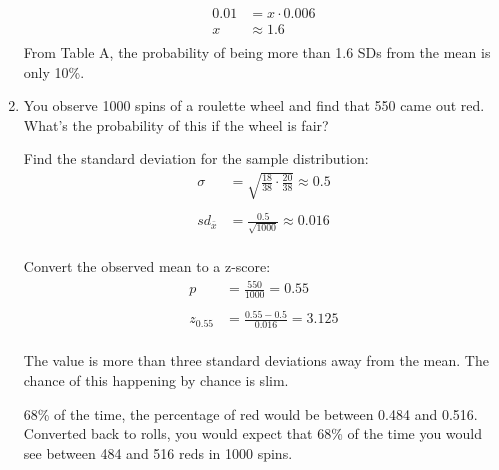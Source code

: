 \documentclass[portrait]{exam}
\begin{document}
\begin{enumerate}
\begin{solution}
        \begin{align*}
          0.01 & = x \cdot 0.006 \\
          x   & \approx 1.6 \\
        \end{align*}
        From Table A, the probability of being more than 1.6 SDs from the mean
        is only 10\%.

      \end{solution}

    \item You observe 1000 spins of a roulette wheel and find that 550 came out
      red. What's the probability of this if the wheel is fair?

      \begin{solution}
        Find the standard deviation for the sample distribution:
        \begin{align*}
          \sigma & = \sqrt{\frac{18}{38} \cdot \frac{20}{38}} \approx 0.5 \\
          \\
          sd_{\bar{x}} & = \frac{0.5}{\sqrt{1000}} \approx 0.016 \\
        \end{align*}

        Convert the observed mean to a z-score:
        \begin{align*}
          p        & = \frac{550}{1000} = 0.55 \\
          \\
          z_{0.55} & = \frac{0.55 - 0.5}{0.016} = 3.125 \\
        \end{align*}

        The value is more than three standard deviations away from the mean. The
        chance of this happening by chance is slim.

        68\% of the time, the percentage of red would be between 0.484 and
        0.516. Converted back to rolls, you would expect that 68\% of the time
        you would see between 484 and 516 reds in 1000 spins.

      \end{solution}
  \end{enumerate}
\end{document}
